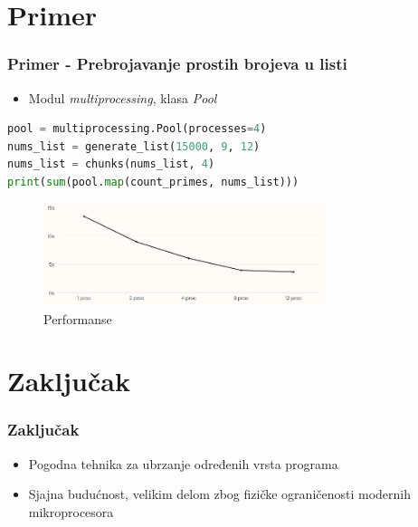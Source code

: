 \documentclass{beamer}
\begin{document}
	\section{Primer}
    \begin{frame}[fragile]\frametitle{Primer - Prebrojavanje prostih brojeva u listi}
        \begin{itemize}
            \item Modul \emph{multiprocessing}, klasa \emph{Pool}
        \end{itemize}
    \begin{lstlisting}[showstringspaces=false, language=Python]
pool = multiprocessing.Pool(processes=4)
nums_list = generate_list(15000, 9, 12)
nums_list = chunks(nums_list, 4)
print(sum(pool.map(count_primes, nums_list)))
    \end{lstlisting} 
    \begin{figure}\includegraphics[height=3cm]{grafik_prez.png}
    \caption{Performanse}
    \end{figure}
    \end{frame}
    \section{Zaključak}
    \begin{frame}[fragile]\frametitle{Zaključak}
        \begin{itemize}
            \item Pogodna tehnika za ubrzanje određenih vrsta programa
            \item Sjajna budućnost, velikim delom zbog fizičke ograničenosti modernih mikroprocesora
        \end{itemize}
    \end{frame}
	

	
\end{document}
